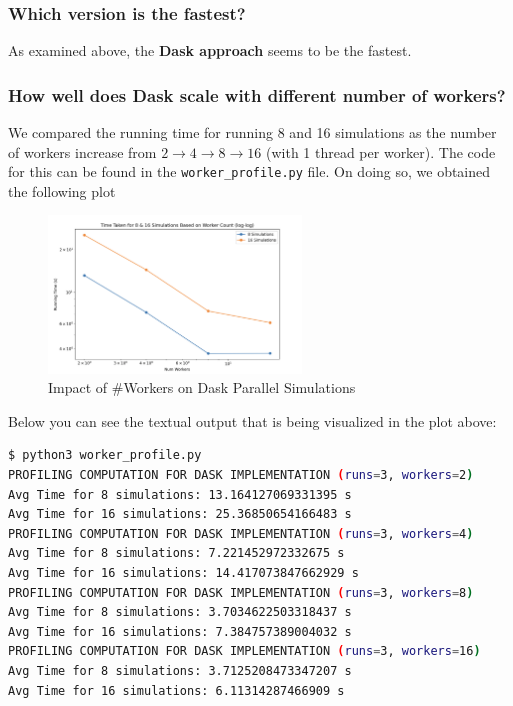 \documentclass[a4paper,12pt]{article}
\begin{document}
\subsubsection{Which version is the fastest?}
As examined above, the \textbf{Dask approach} seems to be the fastest.

\subsubsection{How well does Dask scale with different number of workers?}
We compared the running time for running 8 and 16 simulations as the number of workers increase from $2 \rightarrow 4 \rightarrow 8 \rightarrow 16$ (with 1 thread per worker). The code for this can be found in the \verb|worker_profile.py| file. On doing so, we obtained the following plot
\begin{figure}[H]
  \centering
  \includegraphics[width=0.6\textwidth]{../images/a4_ex1_worker_comparison.png}
  \caption{Impact of \#Workers on Dask Parallel Simulations}
\end{figure}

Below you can see the textual output that is being visualized in the plot above:
\begin{lstlisting}[language=bash,basicstyle=\tiny\ttfamily]
$ python3 worker_profile.py
PROFILING COMPUTATION FOR DASK IMPLEMENTATION (runs=3, workers=2)
Avg Time for 8 simulations: 13.164127069331395 s 
Avg Time for 16 simulations: 25.36850654166483 s 
PROFILING COMPUTATION FOR DASK IMPLEMENTATION (runs=3, workers=4)
Avg Time for 8 simulations: 7.221452972332675 s 
Avg Time for 16 simulations: 14.417073847662929 s 
PROFILING COMPUTATION FOR DASK IMPLEMENTATION (runs=3, workers=8)
Avg Time for 8 simulations: 3.7034622503318437 s 
Avg Time for 16 simulations: 7.384757389004032 s 
PROFILING COMPUTATION FOR DASK IMPLEMENTATION (runs=3, workers=16)
Avg Time for 8 simulations: 3.7125208473347207 s 
Avg Time for 16 simulations: 6.11314287466909 s
\end{lstlisting}
\end{document}
